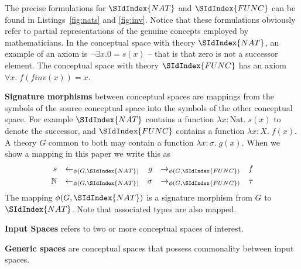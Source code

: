 The precise formulations for $\SIdIndex{NAT}$ and $ \SIdIndex{FUNC}$ can
be found in Listings~\ref{fig:nats} and \ref{fig:inv}. 
Notice that these formulations obviously refer to 
partial representations of the genuine concepts
employed by mathematicians.  
In the conceptual space with theory $\SIdIndex{NAT}$, an example of an axiom is $\neg \exists x. 0 =
s(x)$ -- that is that zero is not a successor element.
The conceptual space with theory $\SIdIndex{FUNC}$ has an axiom
$\forall x.\;f(finv(x)) = x$. 

{\bf Signature morphisms} between conceptual spaces are mappings from
the symbols of the source conceptual space into the symbols of the other
conceptual space. For example $\SIdIndex{NAT}$ contains a function $\lambda
x:\textrm{Nat}.\;s(x)$ to denote the successor, and $\SIdIndex{FUNC}$ contains a function
$\lambda x:X.\;f(x)$. 
A theory $G$ common to both may contain a function
$\lambda x:\sigma.\;g(x)$. When we show a mapping in this paper we write this
as
\begin{align}
s&&\leftarrow_{\phi(G,\SIdIndex{NAT})}&&g&&\rightarrow_{\phi(G,\SIdIndex{FUNC})}&&f\\
\mathbb{N}&&\leftarrow_{\phi(G,\SIdIndex{NAT})}&&\sigma&&\rightarrow_{\phi(G,\SIdIndex{FUNC})}&&\tau
\end{align}
\noindent The mapping $\phi(G,\SIdIndex{NAT})$ is a signature morphism from
$G$ to $\SIdIndex{NAT}$. Note that associated types are also mapped.

{\bf Input Spaces} refers to two or more conceptual spaces of
interest. 

{\bf Generic spaces} are conceptual spaces that possess commonality
between input spaces. 

